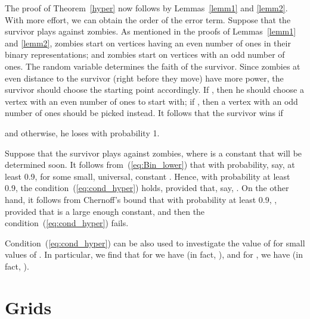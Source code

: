 \documentclass[12pt]{amsart}
\begin{document}
The proof of Theorem~\ref{hyper} now follows by Lemmas~\ref{lemm1} and \ref{lemm2}. With more effort, we can obtain the order of the error term. Suppose that the survivor plays against  zombies. As mentioned in the
proofs of Lemmas~\ref{lemm1} and \ref{lemm2},  zombies start on vertices having an even number of ones in their binary representations; and  zombies start on vertices with an odd number of ones. The random
variable  determines the faith of the survivor. Since zombies at even distance to the survivor (right before they move) have more power, the survivor should choose the starting point accordingly.
If , then he should choose a vertex with an even number of ones to start with; if , then a vertex with an odd number of ones should be picked instead. It follows that the survivor wins if

and otherwise, he loses with probability 1.

Suppose that the survivor plays against  zombies, where  is a constant that will be determined soon. It follows from~(\ref{eq:Bin_lower}) that with probability, say, at least
0.9,  for some small, universal, constant . Hence, with probability at least 0.9, the condition~(\ref{eq:cond_hyper}) holds, provided that, say, . On the other
hand, it follows from Chernoff's bound that with probability at least 0.9, , provided that  is a large enough constant, and then the condition~(\ref{eq:cond_hyper}) fails. 

\medskip

Condition~(\ref{eq:cond_hyper}) can be also used to investigate the value of  for small values of . In particular, we find that for  we have  (in fact, ),
and for , we have  (in fact, ).

\section{Grids}
\end{document}
